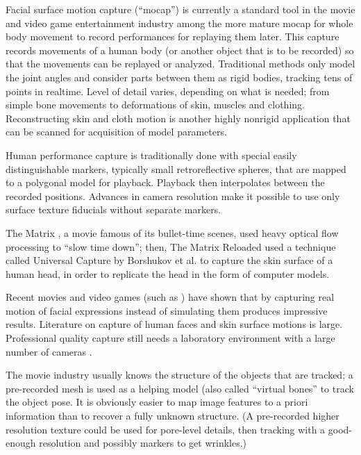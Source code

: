 Facial surface motion capture (``mocap'') is currently a standard tool in the movie and video game entertainment industry among the more mature mocap for whole body movement to record performances for replaying them later.
This capture records movements of a human body (or another object that is to be recorded) so that the movements can be replayed or analyzed. Traditional methods only model the joint angles and consider parts between them as rigid bodies, tracking tens of points in realtime. \cite{todo}
Level of detail varies, depending on what is needed; from simple bone movements to deformations of skin, muscles and clothing.
Reconstructing skin and cloth motion is another highly nonrigid application that can be scanned for acquisition of model parameters. \cite{pritchard2003cloth}

Human performance capture is traditionally done with special easily distinguishable markers, typically small retroreflective spheres, that are mapped to a polygonal model for playback.
Playback then interpolates between the recorded positions.
Advances in camera resolution make it possible to use only surface texture fiducials without separate markers.


The Matrix \cite{wachowski99matrix}, a movie famous of its bullet-time scenes, used heavy optical flow processing to ``slow time down'';
then, The Matrix Reloaded \cite{wachowski03reloaded} used a technique called Universal Capture by Borshukov et al. \cite{borshukov05universal} to capture the skin surface of a human head, in order to replicate the head in the form of computer models.

Recent movies and video games (such as \cite{rockstar2011noire}) have shown that by capturing real motion of facial expressions instead of simulating them produces impressive results.
Literature on capture of human faces and skin surface motions is large. \cite{deng2007computer}
Professional quality capture still needs a laboratory environment with a large number of cameras \cite{winder2008technical,motionscan}.

The movie industry usually knows the structure of the objects that are tracked; a pre-recorded mesh is used as a helping model (also called ``virtual bones'' to track the object pose. \cite{todo} %
It is obviously easier to map image features to a priori information than to recover a fully unknown structure.
(A pre-recorded higher resolution texture could be used for pore-level details, then tracking with a good-enough resolution and possibly markers to get wrinkles.)

